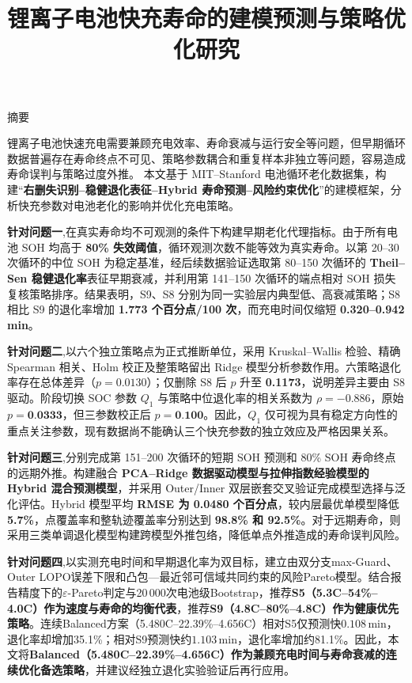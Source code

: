 \documentclass[withoutpreface]{cumcmthesis}
\title{锂离子电池快充寿命的建模预测与策略优化研究}
\begin{document}

\maketitle
\begin{center}
    {\heiti{} 摘\quad 要}
\end{center}

锂离子电池快速充电需要兼顾充电效率、寿命衰减与运行安全等问题，但早期循环数据普遍存在寿命终点不可见、策略参数耦合和重复样本非独立等问题，容易造成寿命误判与策略过度外推。
本文基于 MIT--Stanford 电池循环老化数据集，构建“\textbf{右删失识别--稳健退化表征--Hybrid 寿命预测--风险约束优化}”的建模框架，分析快充参数对电池老化的影响并优化充电策略。

\textbf{针对问题一},在真实寿命均不可观测的条件下构建早期老化代理指标。由于所有电池 SOH 均高于 \textbf{80\% 失效阈值}，循环观测次数不能等效为真实寿命。以第 20--30 次循环的中位 SOH 为稳定基准，经后续数据验证选取第 80--150 次循环的 \textbf{Theil--Sen 稳健退化率}表征早期衰减，并利用第 141--150 次循环的端点相对 SOH 损失复核策略排序。结果表明，S9、S8 分别为同一实验层内典型低、高衰减策略；S8 相比 S9 的退化率增加 \textbf{1.773 个百分点/100 次}，而充电时间仅缩短 \textbf{0.320--0.942 min}。

\textbf{针对问题二},以六个独立策略点为正式推断单位，采用 Kruskal--Wallis 检验、精确 Spearman 相关、Holm 校正及整策略留出 Ridge 模型分析参数作用。六策略退化率存在总体差异（\textbf{\(p=0.0130\)}）；仅删除 S8 后 \(p\) 升至 \textbf{0.1173}，说明差异主要由 S8 驱动。阶段切换 SOC 参数 \(Q_1\) 与策略中位退化率的相关系数为 \textbf{\(\rho=-0.886\)}，原始 \(p=\textbf{0.0333}\)，但三参数校正后 \(p=\textbf{0.100}\)。因此，\(Q_1\) 仅可视为具有稳定方向性的重点关注参数，现有数据尚不能确认三个快充参数的独立效应及严格因果关系。

\textbf{针对问题三},分别完成第 151--200 次循环的短期 SOH 预测和 80\% SOH 寿命终点的远期外推。构建融合 \textbf{PCA--Ridge 数据驱动模型与拉伸指数经验模型的 Hybrid 混合预测模型}，并采用 Outer/Inner 双层嵌套交叉验证完成模型选择与泛化评估。Hybrid 模型平均 \textbf{RMSE 为 0.0480 个百分点}，较内层最优单模型降低 \textbf{5.7\%}，点覆盖率和整轨迹覆盖率分别达到 \textbf{98.8\% 和 92.5\%}。对于远期寿命，则采用三类单调退化模型构建跨模型外推包络，降低单点外推造成的寿命误判风险。

\textbf{针对问题四},以实测充电时间和早期退化率为双目标，建立由双分支max-Guard、Outer LOPO误差下限和凸包—最近邻可信域共同约束的风险Pareto模型。结合报告精度下的$\varepsilon$-Pareto判定与20\,000次电池级Bootstrap，推荐\textbf{S5（5.3C--54\%--4.0C）作为速度与寿命的均衡代表}，推荐\textbf{S9（4.8C--80\%--4.8C）作为健康优先策略}。连续Balanced方案（5.480C--22.39\%--4.656C）相对S5仅预测快$0.108\,\mathrm{min}$，退化率却增加35.1\%；相对S9预测快约$1.103\,\mathrm{min}$，退化率增加约81.1\%。因此，本文将\textbf{Balanced（5.480C--22.39\%--4.656C）作为兼顾充电时间与寿命衰减的连续优化备选策略}，并建议经独立退化实验验证后再行应用。
\end{document}
